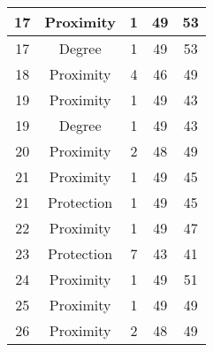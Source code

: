 \documentclass[results.tex]{subfiles}
\begin{document}
\begin{center}
\begin{tabular}{| c || c | c | c | c |}
            \hline
            17                      & Proximity                    & 1                      & 49                      & 53                   \\
            \hline
            17                      & Degree                       & 1                      & 49                      & 53                   \\
            \hline
            18                      & Proximity                    & 4                      & 46                      & 49                   \\
            \hline
            19                      & Proximity                    & 1                      & 49                      & 43                   \\
            \hline
            19                      & Degree                       & 1                      & 49                      & 43                   \\
            \hline
            20                      & Proximity                    & 2                      & 48                      & 49                   \\
            \hline
            21                      & Proximity                    & 1                      & 49                      & 45                   \\
            \hline
            21                      & Protection                   & 1                      & 49                      & 45                   \\
            \hline
            22                      & Proximity                    & 1                      & 49                      & 47                   \\
            \hline
            23                      & Protection                   & 7                      & 43                      & 41                   \\
            \hline
            24                      & Proximity                    & 1                      & 49                      & 51                   \\
            \hline
            25                      & Proximity                    & 1                      & 49                      & 49                   \\
            \hline
            26                      & Proximity                    & 2                      & 48                      & 49                   \\

\end{tabular}
\end{center}
\end{document}
